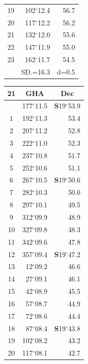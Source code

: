 \documentclass[10pt, a4paper]{report}
\begin{document}
\begin{scriptsize}
\begin{tabular*}{0.2\textwidth}[t]{@{\extracolsep{\fill}}|c|rr|}
19 & 102$^\circ$12.4 & 56.7\\
20 & 117$^\circ$12.2 & 56.2\\
21 & 132$^\circ$12.0 & \raisebox{0.24ex}{\boldmath$\cdot$~\boldmath$\cdot$~~}55.6\\
22 & 147$^\circ$11.9 & 55.0\\
23 & 162$^\circ$11.7 & 54.5\\
\hline
\rule{0pt}{2.4ex} & \multicolumn{1}{c}{SD.=16.3} & \multicolumn{1}{c|}{d=0.5}\\
\hline
\end{tabular*}\noindent
\begin{tabular*}{0.2\textwidth}[t]{@{\extracolsep{\fill}}|c|rr|}
\hline
\multicolumn{1}{|c|}{\rule{0pt}{2.6ex}\textbf{21}} & \multicolumn{1}{c}{\textbf{GHA}} & \multicolumn{1}{c|}{\textbf{Dec}}\\
\hline\rule{0pt}{2.6ex}\noindent
0 & 177$^\circ$11.5 & \textbf{S}19$^\circ$53.9\\
1 & 192$^\circ$11.3 & 53.4\\
2 & 207$^\circ$11.2 & 52.8\\
3 & 222$^\circ$11.0 & \raisebox{0.24ex}{\boldmath$\cdot$~\boldmath$\cdot$~~}52.3\\
4 & 237$^\circ$10.8 & 51.7\\
5 & 252$^\circ$10.6 & 51.1\\[2Pt]
6 & 267$^\circ$10.5 & \textbf{S}19$^\circ$50.6\\
7 & 282$^\circ$10.3 & 50.0\\
8 & 297$^\circ$10.1 & 49.5\\
9 & 312$^\circ$09.9 & \raisebox{0.24ex}{\boldmath$\cdot$~\boldmath$\cdot$~~}48.9\\
10 & 327$^\circ$09.8 & 48.3\\
11 & 342$^\circ$09.6 & 47.8\\[2Pt]
12 & 357$^\circ$09.4 & \textbf{S}19$^\circ$47.2\\
13 & 12$^\circ$09.2 & 46.6\\
14 & 27$^\circ$09.1 & 46.1\\
15 & 42$^\circ$08.9 & \raisebox{0.24ex}{\boldmath$\cdot$~\boldmath$\cdot$~~}45.5\\
16 & 57$^\circ$08.7 & 44.9\\
17 & 72$^\circ$08.6 & 44.4\\[2Pt]
18 & 87$^\circ$08.4 & \textbf{S}19$^\circ$43.8\\
19 & 102$^\circ$08.2 & 43.2\\
20 & 117$^\circ$08.1 & 42.7\\

\end{tabular*}
\end{scriptsize}
\end{document}
